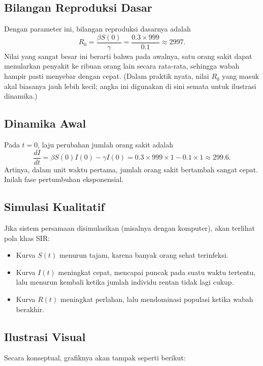 \documentclass{bukumjh}
\begin{document}
\subsection*{Bilangan Reproduksi Dasar}
Dengan parameter ini, bilangan reproduksi dasarnya adalah
\[
R_0 = \frac{\beta S(0)}{\gamma} = \frac{0.3 \times 999}{0.1} \approx 2997.
\]
Nilai yang sangat besar ini berarti bahwa pada awalnya, satu orang sakit dapat menularkan penyakit ke ribuan orang lain secara rata-rata, sehingga wabah hampir pasti menyebar dengan cepat. (Dalam praktik nyata, nilai $R_0$ yang masuk akal biasanya jauh lebih kecil; angka ini digunakan di sini semata untuk ilustrasi dinamika.)

\subsection*{Dinamika Awal}
Pada $t=0$, laju perubahan jumlah orang sakit adalah
\[
\frac{dI}{dt} = \beta S(0) I(0) - \gamma I(0) 
= 0.3 \times 999 \times 1 - 0.1 \times 1 
\approx 299.6.
\]
Artinya, dalam unit waktu pertama, jumlah orang sakit bertambah sangat cepat. Inilah fase pertumbuhan eksponensial.

\subsection*{Simulasi Kualitatif}
Jika sistem persamaan disimulasikan (misalnya dengan komputer), akan terlihat pola khas SIR:
\begin{itemize}
    \item Kurva $S(t)$ menurun tajam, karena banyak orang sehat terinfeksi.
    \item Kurva $I(t)$ meningkat cepat, mencapai puncak pada suatu waktu tertentu, lalu menurun kembali ketika jumlah individu rentan tidak lagi cukup.
    \item Kurva $R(t)$ meningkat perlahan, lalu mendominasi populasi ketika wabah berakhir.
\end{itemize}

\subsection*{Ilustrasi Visual}
Secara konseptual, grafiknya akan tampak seperti berikut:

\begin{center}
\end{center}
\end{document}
